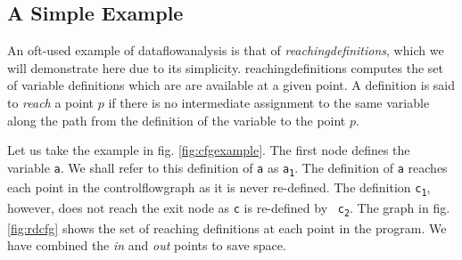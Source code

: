 \documentclass[bsc,twoside,singlespacing,parskip,logo,notimes,normalheadings]{infthesis}
\begin{document}
	\subsection{A Simple Example}
	An oft-used example of \gls{dataflowanalysis} is that of {\em
          \gls{reachingdefinition}s}, which we will demonstrate here due to
        its simplicity. \Gls{reachingdefinition}s computes the set of
        variable definitions which are are available at a given
        point. A definition is said to {\em reach} a point $p$ if
        there is no intermediate assignment to the same variable along
        the path from the definition of the variable to the point $p$.
        
        Let us take the example in fig. \ref{fig:cfgexample}. The first
        node defines the variable {\tt a}. We shall refer to this
        definition of {\tt a} as {\tt a\textsubscript{1}}. The
        definition of {\tt a} reaches each point in the
        \gls{controlflowgraph} as it is never re-defined. The
        definition {\tt c\textsubscript{1}}, however, does not reach
        the exit node as {\tt c} is re-defined by {\tt
          c\textsubscript{2}}. The graph in fig. \ref{fig:rdcfg} shows the
        set of reaching definitions at each point in the program. We
        have combined the {\em in} and {\em out} points to save space.
        
\end{document}
